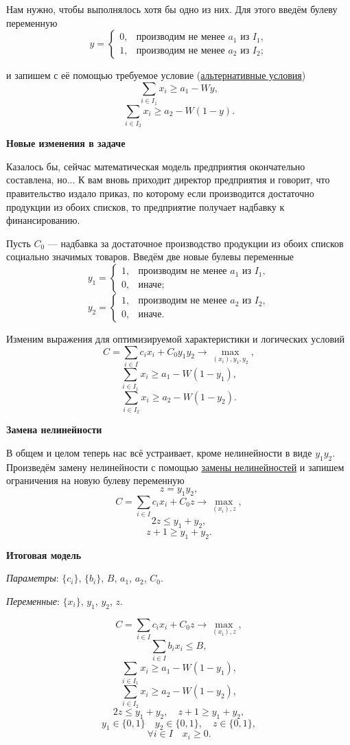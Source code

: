 Нам нужно, чтобы выполнялось хотя бы одно из них. Для этого введём булеву переменную
\[
y = \begin{cases}
	0, & \text{производим не менее $a_1$ из $I_1$}, \\
	1, & \text{производим не менее $a_2$ из $I_2$};
\end{cases}
\]

и запишем с её помощью требуемое условие (\hyperref[fact:alternative_conditions]{альтернативные условия})
\[
\sum_{i \in I_1} x_i \ge a_1 - Wy,
\]
\[
\sum_{i \in I_2} x_i \ge a_2 - W(1 - y).
\]

\textbf{Новые изменения в задаче}

Казалось бы, сейчас математическая модель предприятия окончательно составлена, но... К вам вновь приходит директор предприятия и говорит, что правительство издало приказ, по которому если производится достаточно продукции из обоих списков, то предприятие получает надбавку к финансированию.

Пусть $C_0$ --- надбавка за достаточное производство продукции из обоих списков социально значимых товаров. Введём две новые булевы переменные
\[
y_1 = \begin{cases}
	1, & \text{производим не менее $a_1$ из $I_1$}, \\
	0, & \text{иначе};
\end{cases}
\]
\[
y_2 = \begin{cases}
	1, & \text{производим не менее $a_2$ из $I_2$}, \\
	0, & \text{иначе}.
\end{cases}
\]

Изменим выражения для оптимизируемой характеристики и логических условий
\[
C = \sum_{i \in I}c_i x_i + C_0 y_1 y_2 \to \max_{(x_i), y_1, y_2},
\]
\[
\sum_{i \in I_1} x_i \ge a_1 - W(1 - y_1),
\]
\[
\sum_{i \in I_2} x_i \ge a_2 - W(1 - y_2).
\]

\textbf{Замена нелинейности}

В общем и целом теперь нас всё устраивает, кроме нелинейности в виде $y_1 y_2$. Произведём замену нелинейности с помощью \hyperref[fact:substituion_of_nonlinear]{замены нелинейностей} и запишем ограничения на новую булеву переменную
\[
z = y_1 y_2,
\]
\[
C = \sum_{i \in I}c_i x_i + C_0 z \to \max_{(x_i), z},
\]
\[
2z \le y_1 + y_2,
\]
\[
z + 1 \ge y_1 + y_2.
\]

\textbf{Итоговая модель}

\textit{Параметры}: $\{c_i\}$, $\{b_i\}$, $B$, $a_1$, $a_2$, $C_0$.

\textit{Переменные}: $\{x_i\}$, $y_1$, $y_2$, $z$.

\[
C = \sum_{i \in I}c_i x_i + C_0 z \to \max_{(x_i), z},
\]
\[
\sum_{i \in I}b_i x_i \le B,
\]
\[
\sum_{i \in I_1} x_i \ge a_1 - W(1 - y_1),
\]
\[
\sum_{i \in I_2} x_i \ge a_2 - W(1 - y_2),
\]
\[
2z \le y_1 + y_2, \quad z + 1 \ge y_1 + y_2,
\]
\[
y_1 \in \{0, 1\} \quad y_2 \in \{0, 1\}, \quad z \in \{0, 1\},
\]
\[
\forall i \in I \quad x_i \ge 0.
\]
